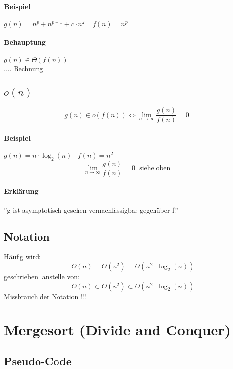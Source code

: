 \paragraph{Beispiel} $g(n) = n^p + n^{p-1} + c \cdot n^2~~~~~f(n) = n^p$
\paragraph{Behauptung} $g(n) \in \Theta(f(n))$ \\
.... Rechnung

\subsection{$o(n)$}

\[g(n) \in o(f(n)) \Leftrightarrow \lim\limits_{n \rightarrow \infty}{\frac{g(n)}{f(n)}} = 0\]
\paragraph{Beispiel} $g(n) = n \cdot \log_2(n)~~~~f(n) = n^2$\\
\[\lim\limits_{n \rightarrow \infty}{\frac{g(n)}{f(n)}} = 0~~~\text{siehe oben}\]
\paragraph{Erklärung} ''g ist asymptotisch gesehen vernachlässigbar gegenüber f.''

\pagebreak


\begin{mdframed}
\subsection{Notation}
Häufig wird:
\[~~~~~~~~O(n) = O(n^2) = O(n^2 \cdot \log_2(n))\]
geschrieben, anstelle von:
\[~~~~~~~~O(n) \subset O(n^2) \subset O(n^2 \cdot \log_2(n))\]
Missbrauch der Notation !!!\\

\end{mdframed}


\section{Mergesort (Divide and Conquer)}

\subsection{Pseudo-Code}


